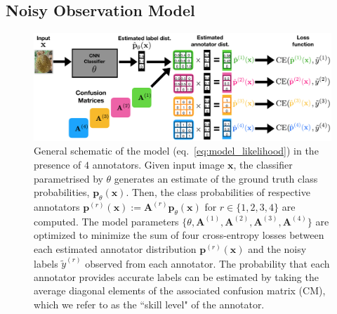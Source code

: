 \subsection{Noisy Observation Model}
\begin{figure}[ht]
	\center
	\includegraphics[width=\linewidth]{chapter_4/figures/model_schematic_2.png}
	\small
	\caption{\small General schematic of the model (eq.~\ref{eq:model_likelihood}) in the presence of $4$ annotators. Given input image $\mathbf{x}$, the classifier parametrised by $\theta$ generates an estimate of the ground truth class probabilities, $\mathbf{p}_{\theta}(\mathbf{x})$. Then, the class probabilities of respective annotators $\mathbf{p}^{(r)}(\mathbf{x}):= \mathbf{A}^{(r)}\mathbf{p}_{\theta}(\mathbf{x})$ for $r\in \{1,2,3,4\}$ are computed. The model parameters $\{\theta, \mathbf{A}^{(1)}, \mathbf{A}^{(2)}, \mathbf{A}^{(3)}, \mathbf{A}^{(4)}\}$ are optimized to minimize the sum of four cross-entropy losses between each estimated annotator distribution $\textbf{p}^{(r)}(\mathbf{x})$ and the noisy labels $\tilde{y}^{(r)}$ observed from each annotator. The probability that each annotator provides accurate labels can be estimated by taking the average diagonal elements of the associated confusion matrix (CM), which we refer to as the ``skill level" of the annotator.}
    \label{fig:schematic}
    \vspace{-4mm}
\end{figure}

